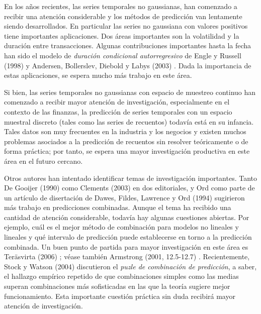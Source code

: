 \documentclass{llncs}
\begin{document}
En los años recientes, las series temporales no gaussianas, han comenzado a recibir una atención considerable y los métodos de predicción van lentamente siendo desarrollados. En particular las series no gaussiana con valores positivos tiene importantes aplicaciones. Dos áreas importantes son la volatilidad y la duración entre transacciones. Algunas contribuciones importantes hasta la fecha han sido el modelo de \emph{duración condicional autorregresivo} de Engle y Russell (1998) \cite{Engle19981127} y Andersen, Bollerslev, Diebold y Labys (2003) \cite{Andersen2003579}. Dada la importancia de estas aplicaciones, se espera mucho más trabajo en este área.

Si bien, las series temporales no gaussianas con espacio de muestreo continuo han comenzado a recibir mayor atención de investigación, especialmente en el contexto de las  finanzas, la predicción de series temporales con un espacio muestral discreto (tales como las series de recuentos) todavía está en su infancia. Tales datos son muy frecuentes en la industria y los negocios y existen muchos problemas asociados a la predicción de recuentos sin resolver teóricamente o de forma práctica; por tanto, se espera una mayor investigación productiva en este área en el futuro cercano.

Otros autores han intentado identificar temas de investigación importantes. Tanto De Gooijer (1990) \cite{deGooijer1990449} como Clements (2003) \cite{Clements20031} en dos editoriales, y Ord como parte de un artículo de disertación de Dawes, Fildes, Lawrence y Ord (1994) \cite{Dawes1994151} sugirieron más trabajo en predicciones combinadas. Aunque el tema ha recibido una cantidad de atención considerable, todavía hay algunas cuestiones abiertas. Por ejemplo, cuál es el mejor método de combinación para modelos no lineales y lineales y qué intervalo de predicción puede establecerse en torno a la predicción combinada. Un buen punto de partida para mayor investigación en este área es Teräsvirta (2006) \cite{Terasvirta2006}; véase también Armstrong (2001, 12.5-12.7) \cite{Armstrong2001}. Recientemente, Stock y Watson (2004) \cite{Stock2004405} discutieron el \emph{puzle de combinación de predicción}, a saber, el hallazgo empírico repetido de que combinaciones simples como las medias superan combinaciones más sofisticadas en las que la teoría sugiere mejor funcionamiento. Esta importante cuestión práctica sin duda recibirá mayor atención de investigación.
\end{document}
